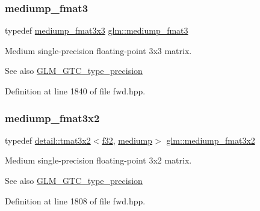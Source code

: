 \subsubsection{\texorpdfstring{mediump\+\_\+fmat3}{mediump\_fmat3}}
{\footnotesize\ttfamily typedef \hyperlink{group__gtc__type__precision_gaa7f015dd5b962a658178bb881d4620cc}{mediump\+\_\+fmat3x3} \hyperlink{group__gtc__type__precision_ga85f2267401434ea8c5463af040f0760c}{glm\+::mediump\+\_\+fmat3}}

Medium single-\/precision floating-\/point 3x3 matrix. \begin{DoxySeeAlso}{See also}
\hyperlink{group__gtc__type__precision}{G\+L\+M\+\_\+\+G\+T\+C\+\_\+type\+\_\+precision} 
\end{DoxySeeAlso}


Definition at line 1840 of file fwd.\+hpp.

\mbox{\label{group__gtc__type__precision_ga40681f25413b8705b16da2f534692f59}} 
\subsubsection{\texorpdfstring{mediump\+\_\+fmat3x2}{mediump\_fmat3x2}}
{\footnotesize\ttfamily typedef \hyperlink{structglm_1_1detail_1_1tmat3x2}{detail\+::tmat3x2}$<$\hyperlink{group__gtc__type__precision_ga0ec999b57f5330d9021256e96038df04}{f32}, \hyperlink{namespaceglm_a0f04f086094c747d227af4425893f545a6416f3ea0c9025fb21ed50c4d6620482}{mediump}$>$ \hyperlink{group__gtc__type__precision_ga40681f25413b8705b16da2f534692f59}{glm\+::mediump\+\_\+fmat3x2}}

Medium single-\/precision floating-\/point 3x2 matrix. \begin{DoxySeeAlso}{See also}
\hyperlink{group__gtc__type__precision}{G\+L\+M\+\_\+\+G\+T\+C\+\_\+type\+\_\+precision} 
\end{DoxySeeAlso}


Definition at line 1808 of file fwd.\+hpp.

\mbox{\label{group__gtc__type__precision_gaa7f015dd5b962a658178bb881d4620cc}} 
